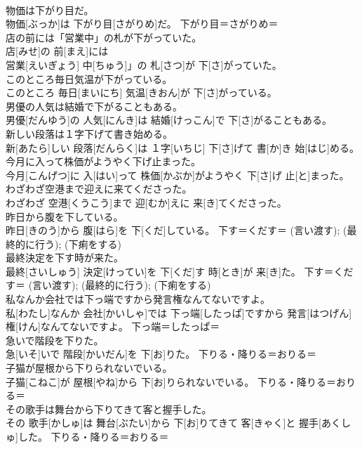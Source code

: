 \documentclass[8pt]{extreport}
\begin{document}
\begin{CJK}{UTF8}{min}
{\\	物価は下がり目だ。	
\\	物価[ぶっか]は 下がり目[さがりめ]だ。	下がり目＝さがりめ＝ 
\\	店の前には「営業中」の札が下がっていた。	
\\	店[みせ]の 前[まえ]には
\\	営業[えいぎょう] 中[ちゅう]」の 札[さつ]が 下[さ]がっていた。	
\\	このところ毎日気温が下がっている。	
\\	このところ 毎日[まいにち] 気温[きおん]が 下[さ]がっている。	
\\	男優の人気は結婚で下がることもある。	
\\	男優[だんゆう]の 人気[にんき]は 結婚[けっこん]で 下[さ]がることもある。	
\\	新しい段落は１字下げて書き始める。	
\\	新[あたら]しい 段落[だんらく]は １字[いちじ] 下[さ]げて 書[か]き 始[はじ]める。	
\\	今月に入って株価がようやく下げ止まった。	
\\	今月[こんげつ]に 入[はい]って 株価[かぶか]がようやく 下[さ]げ 止[と]まった。	
\\	わざわざ空港まで迎えに来てくださった。	
\\	わざわざ 空港[くうこう]まで 迎[むか]えに 来[き]てくださった。	
\\	昨日から腹を下している。	
\\	昨日[きのう]から 腹[はら]を 下[くだ]している。	下す＝くだす＝ (言い渡す); (最終的に行う); (下痢をする) 
\\	最終決定を下す時が来た。	
\\	最終[さいしゅう] 決定[けってい]を 下[くだ]す 時[とき]が 来[き]た。	下す＝くだす＝ (言い渡す); (最終的に行う); (下痢をする) 
\\	私なんか会社では下っ端ですから発言権なんてないですよ。	
\\	私[わたし]なんか 会社[かいしゃ]では 下っ端[したっぱ]ですから 発言[はつげん] 権[けん]なんてないですよ。	下っ端＝したっぱ＝ 
\\	急いで階段を下りた。	
\\	急[いそ]いで 階段[かいだん]を 下[お]りた。	下りる・降りる＝おりる＝ 
\\	子猫が屋根から下りられないでいる。	
\\	子猫[こねこ]が 屋根[やね]から 下[お]りられないでいる。	下りる・降りる＝おりる＝ 
\\	その歌手は舞台から下りてきて客と握手した。	
\\	その 歌手[かしゅ]は 舞台[ぶたい]から 下[お]りてきて 客[きゃく]と 握手[あくしゅ]した。	下りる・降りる＝おりる＝ 
}
\end{CJK}
\end{document}
